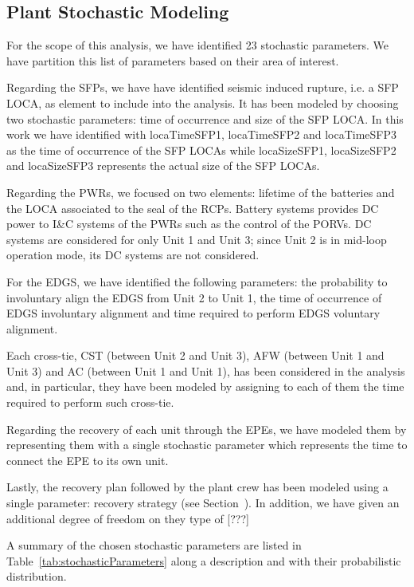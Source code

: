 \subsection{Plant Stochastic Modeling}
For the scope of this analysis, we have identified 23 stochastic parameters. We have 
partition this list of parameters based on their area of interest.

Regarding the SFPs, we have have identified seismic induced rupture, i.e. a SFP LOCA, as 
element to include into the analysis. It has been modeled by choosing two stochastic 
parameters: time of  occurrence and size of the SFP LOCA. In this work we have identified 
with locaTimeSFP1, locaTimeSFP2 and locaTimeSFP3 as the time of occurrence of the SFP 
LOCAs while locaSizeSFP1, locaSizeSFP2 and locaSizeSFP3 represents the actual size of 
the SFP LOCAs.

Regarding the PWRs, we focused on two elements: lifetime of the batteries and the LOCA 
associated to the seal of the RCPs. Battery systems provides DC power to I\&C systems 
of the PWRs such as the control of the PORVs. DC systems are considered for only 
Unit 1 and Unit 3; since Unit 2 is in mid-loop operation mode, its DC systems are not 
considered.

For the EDGS, we have identified the following parameters: the probability to 
involuntary align the EDGS from Unit 2 to Unit 1, the time of occurrence of EDGS
involuntary alignment and time required to perform EDGS voluntary alignment.  

Each cross-tie, CST (between Unit 2 and Unit 3), AFW (between Unit 1 and Unit 3) 
and AC (between Unit 1 and Unit 1), has been considered in the analysis and, in 
particular, they have been modeled by assigning to each of them the time required 
to perform such cross-tie.

Regarding the recovery of each unit through the EPEs, we have modeled them by 
representing them with a single stochastic parameter which represents the
time to connect the EPE to its own unit.

Lastly, the recovery plan followed by the plant crew has been modeled using a single
parameter: recovery strategy (see Section~\cite{sec:accidentProgression}).
In addition, we have given an additional degree of freedom on they type of [???]   

A summary of the chosen stochastic parameters are listed in Table~\ref{tab:stochasticParameters} 
along a description and with their probabilistic distribution.

